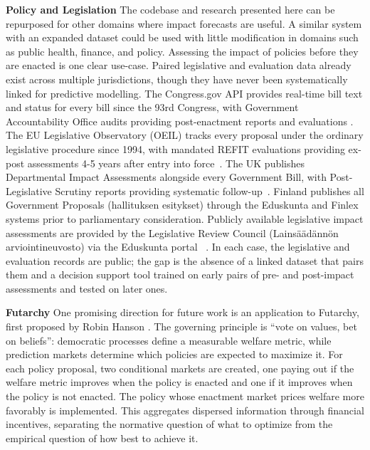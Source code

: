 \documentclass[12pt,a4paper]{article}
\let\citep\parencite
\begin{document}
\textbf{Policy and Legislation}
The codebase and research presented here can be repurposed for other domains where impact forecasts are useful. A similar system with an expanded dataset could be used with little modification in domains such as public health, finance, and policy. Assessing the impact of policies before they are enacted is one clear use-case. Paired legislative and evaluation data already exist across multiple jurisdictions, though
they have never been systematically linked for predictive modelling. The Congress.gov
API provides real-time bill text and status for every bill since the 93rd Congress, with
Government Accountability Office audits providing post-enactment
reports and evaluations \citep{officeReportsUSGAO}. The EU Legislative Observatory (OEIL)
tracks every proposal under the ordinary legislative procedure since 1994, with mandated
REFIT evaluations providing ex-post assessments 4-5 years after entry into
force~\citep{europeancourtofauditorsExpostReviewEU2018}. The UK publishes Departmental Impact Assessments
alongside every Government Bill, with Post-Legislative Scrutiny reports providing
systematic follow-up~\citep{GuideMakingLegislation}. Finland publishes all Government Proposals (hallituksen esitykset) through the Eduskunta and Finlex systems prior to parliamentary consideration. Publicly available legislative impact assessments are provided by the Legislative Review Council (Lainsäädännön arviointineuvosto) via the Eduskunta portal ~\citep{LainsaadannonArviointineuvosto}. In each case, the legislative
and evaluation records are public; the gap is the absence of a linked
dataset that pairs them and a decision support tool trained on early pairs of pre- and post-impact assessments and tested on later ones.


\textbf{Futarchy}
One promising direction for future work is an application to Futarchy, first proposed by Robin Hanson \citep{hansonShallWeVote2013}. The governing principle is ``vote on values, bet on beliefs'': democratic processes define a measurable welfare metric, while prediction markets determine which policies are expected to maximize it. For each policy proposal, two conditional markets are created, one paying out if the welfare metric improves when the policy is enacted and one if it improves when the policy is not enacted. The policy whose enactment market prices welfare more favorably is implemented. This aggregates dispersed information through financial incentives, separating the normative question of what to optimize from the empirical question of how best to achieve it.
\end{document}
